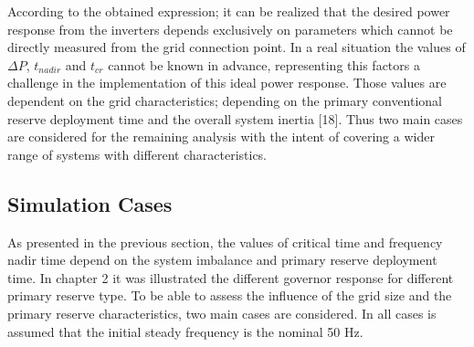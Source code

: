 
According to the obtained expression; it can be realized that the desired power response from the inverters depends exclusively on parameters which cannot be directly measured from the grid connection point. In a real situation the values of $\Delta P$, $ t_{nadir} $ and $ t_{cr} $ cannot be known in advance, representing this factors a challenge in the implementation of this ideal power response. Those values are dependent on the grid characteristics; depending on the primary conventional reserve deployment time and the overall system inertia [18]. Thus two main cases are considered for the remaining analysis with the intent of covering a wider range of systems with different characteristics.

\subsection{Simulation Cases}

As presented in the previous section, the values of critical time and frequency nadir time depend on the system imbalance and primary reserve deployment time. In chapter 2 it was illustrated the different governor response for different primary reserve type. To be able to assess the influence of the grid size and the primary reserve characteristics, two main cases are considered. In all cases is assumed that the initial steady frequency is the nominal 50 Hz.


